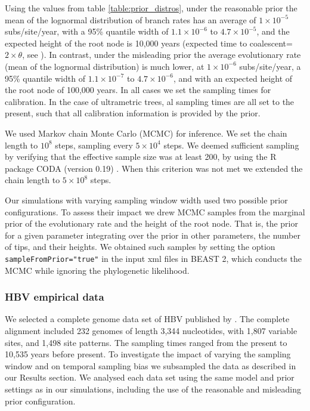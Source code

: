 \documentclass[11pt]{article}
\begin{document}
Using the values from table \ref{table:prior_distros}, under the reasonable prior the mean of the lognormal distribution of branch rates has an average of $1\times 10^{-5}$ subs/site/year, with a 95\% quantile width of $1.1\times 10^{-6}$ to $4.7\times10^{-5}$, and the expected height of the root node is 10,000 years (expected time to coalescent=$2\times \theta$, see \cite{nordborg2019coalescent}). In contrast, under the misleading prior the average evolutionary rate (mean of the lognormal distribution) is much lower, at $1\times10^{-6}$ subs/site/year, a 95\% quantile width of $1.1\times10^{-7}$ to $4.7\times10^{-6}$, and with an expected height of the root node of 100,000 years. In all cases we set the sampling times for calibration. In the case of ultrametric trees, al sampling times are all set to the present, such that all calibration information is provided by the prior.

We used Markov chain Monte Carlo (MCMC) for inference. We set the chain length to $10^{8}$ steps, sampling every $5\times10^{4}$ steps. We deemed sufficient sampling by verifying that the effective sample size was at least 200, by using the R package CODA (version 0.19) \citep{plummer2006coda}. When this criterion was not met we extended the chain length to $5\times10^{8}$ steps. 

Our simulations with varying sampling window width used two possible prior configurations. To assess their impact we drew MCMC samples from the marginal prior of the evolutionary rate and the height of the root node. That is, the prior for a given parameter integrating over the prior in other parameters, the number of tips, and their heights. We obtained such samples by setting the option \texttt{sampleFromPrior="true"} in the input xml files in BEAST 2, which conducts the MCMC while ignoring the phylogenetic likelihood.

\subsubsection{HBV empirical data}
We selected a complete genome data set of HBV published by \cite{kocher2021ten}. The complete alignment included 232 genomes of length 3,344 nucleotides, with 1,807 variable sites, and 1,498 site patterns. The sampling times ranged from the present to 10,535 years before present. To investigate the impact of varying the sampling window and on temporal sampling bias we subsampled the data as described in our Results section. We analysed each data set using the same model and prior settings as in our simulations, including the use of the reasonable and misleading prior configuration.
\end{document}
